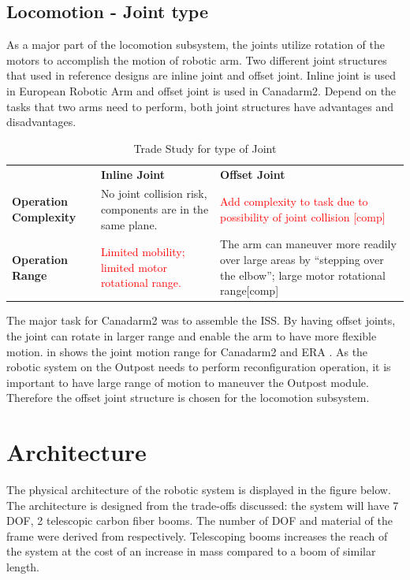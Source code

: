 \documentclass[12pt, letterpaper]{article}
\begin{document}
\subsection{Locomotion - Joint type}
\label{sect:jointto}
As a major part of the locomotion subsystem, the joints utilize rotation of the motors to accomplish the motion of robotic arm. Two different joint structures that used in reference designs are inline joint and offset joint. Inline joint is used in European Robotic Arm and offset joint is used in Canadarm2. Depend on the tasks that two arms need to perform, both joint structures have advantages and disadvantages.
\begin{table}[H]
\caption{Trade Study for type of Joint}
\begin{tabular}{|P{2.5cm}|P{6.35cm}|P{6.35cm}|}
\hline
	&	\textbf{Inline Joint}	&
	\textbf{Offset Joint}	\\\hhline{|=|=|=|}
\textbf{Operation Complexity}	&
\textcolor{OliveGreen}{No joint collision risk, components are in the same plane.}	&
\textcolor{red}{Add complexity to task due to possibility of joint collision [comp]}	\\\hline
\textbf{Operation Range}	&
\textcolor{red}{Limited mobility; limited motor rotational range.}	&
\textcolor{OliveGreen}{The arm can maneuver more readily over large areas by “stepping over the elbow”; large motor rotational range[comp]}	\\\hline
\end{tabular}
\label{table:jointto}
\end{table}

The major task for Canadarm2 was to assemble the ISS. By having offset joints, the joint can rotate in larger range and enable the arm to have more flexible motion.  in  shows the joint motion range for Canadarm2 and ERA \cite{arm_comp}. As the robotic system on the Outpost needs to perform reconfiguration operation, it is important to have large range of motion to maneuver the Outpost module. Therefore the offset joint structure is chosen for the locomotion subsystem.

\section{Architecture}
\label{sect:architecture}
The physical architecture of the robotic system is displayed in the figure below. The architecture is designed from the trade-offs discussed: the system will have 7 DOF, 2 telescopic carbon fiber booms. The number of DOF and material of the frame were derived from  respectively. Telescoping booms increases the reach of the system at the cost of an increase in mass compared to a boom of similar length.
\end{document}
